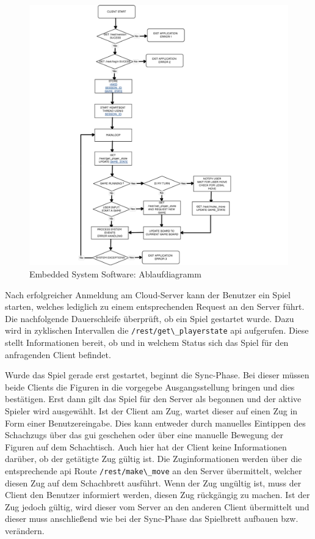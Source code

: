 \begin{figure}
\centering
\includegraphics{images/ATC_gameclient_statemachiene.png}
\caption{Embedded System Software: Ablaufdiagramm
\label{ATC_gameclient_statemachiene}}
\end{figure}

Nach erfolgreicher Anmeldung am Cloud-Server kann der Benutzer ein Spiel
starten, welches lediglich zu einem entsprechenden Request an den Server
führt. Die nachfolgende Dauerschleife überprüft, ob ein Spiel gestartet
wurde. Dazu wird in zyklischen Intervallen die
\passthrough{\lstinline!/rest/get\_playerstate!} \gls{api} aufgerufen.
Diese stellt Informationen bereit, ob und in welchem Status sich das
Spiel für den anfragenden Client befindet.

Wurde das Spiel gerade erst gestartet, beginnt die Sync-Phase. Bei
dieser müssen beide Clients die Figuren in die vorgegebe
Ausgangsstellung bringen und dies bestätigen. Erst dann gilt das Spiel
für den Server als begonnen und der aktive Spieler wird ausgewählt. Ist
der Client am Zug, wartet dieser auf einen Zug in Form einer
Benutzereingabe. Dies kann entweder durch manuelles Eintippen des
Schachzugs über das \gls{gui} geschehen oder über eine manuelle Bewegung
der Figuren auf dem Schachtisch. Auch hier hat der Client keine
Informationen darüber, ob der getätigte Zug gültig ist. Die
Zuginformationen werden über die entsprechende \gls{api} Route
\passthrough{\lstinline!/rest/make\_move!} an den Server übermittelt,
welcher diesen Zug auf dem Schachbrett ausführt. Wenn der Zug ungültig
ist, muss der Client den Benutzer informiert werden, diesen Zug
rückgängig zu machen. Ist der Zug jedoch gültig, wird dieser vom Server
an den anderen Client übermittelt und dieser muss anschließend wie bei
der Sync-Phase das Spielbrett aufbauen bzw. verändern.

